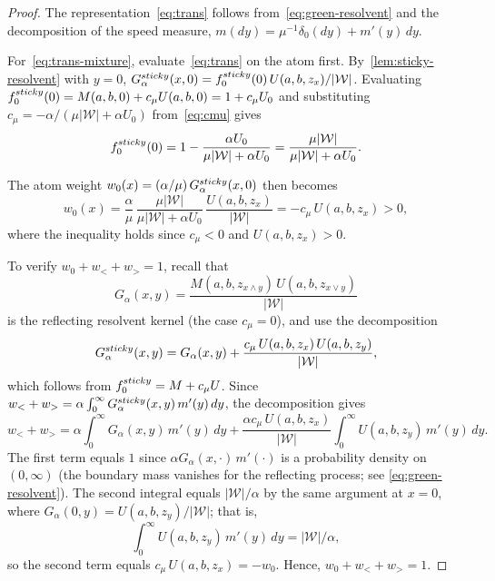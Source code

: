 \documentclass[10pt,a4paper]{amsart}
\begin{document}
\begin{proof}
  The representation~\cref{eq:trans} follows from~\cref{eq:green-resolvent}
  and the decomposition of the speed measure,
  $m(dy)=\mu^{-1}\delta_0(dy)+m'(y)\,dy$.

  For~\cref{eq:trans-mixture}, evaluate~\cref{eq:trans} on the atom first.
  By~\cref{lem:sticky-resolvent} with $y=0$,
  $G^{\rm sticky}_\alpha(x,0) = f_0^{\rm sticky}(0)\,U(a,b,z_x)/|\mathcal{W}|$.
  Evaluating $f_0^{\rm sticky}(0) = M(a,b,0)+c_\mu U(a,b,0) = 1+c_\mu U_0$
  and substituting $c_\mu=-\alpha/(\mu|\mathcal{W}|+\alpha U_0)$
  from~\cref{eq:cmu} gives
  \begin{equation}\label{eq:f0sticky-zero}   
    f_0^{\rm sticky}(0)
    = 1 - \frac{\alpha U_0}{\mu|\mathcal{W}|+\alpha U_0}
    = \frac{\mu|\mathcal{W}|}{\mu|\mathcal{W}|+\alpha U_0}.
  \end{equation}

  The atom weight $w_0(x) = (\alpha/\mu)\,G^{\rm sticky}_\alpha(x,0)$ then
  becomes
  \[
    w_0(x)
    = \frac{\alpha}{\mu}
      \,\frac{\mu|\mathcal{W}|}{\mu|\mathcal{W}|+\alpha U_0}
      \,\frac{U(a,b,z_x)}{|\mathcal{W}|}
    = -c_\mu\,U(a,b,z_x) > 0,
  \]
  where the inequality holds since $c_\mu<0$ and $U(a,b,z_x)>0$.

  To verify $w_0+w_<+w_>=1$, recall that
  \[
    G_\alpha(x,y) = \frac{M(a,b,z_{x\wedge y})\,U(a,b,z_{x\vee y})}{|\mathcal{W}|}
  \]
  is the reflecting resolvent kernel (the case $c_\mu=0$), and use the decomposition
  \[
    G^{\rm sticky}_\alpha(x,y)
    = G_\alpha(x,y)
    + \frac{c_\mu\,U(a,b,z_x)\,U(a,b,z_y)}{|\mathcal{W}|},
  \]
  which follows from $f^{\rm sticky}_0 = M + c_\mu U$. Since
  $w_<+w_> = \alpha\int_0^\infty G^{\rm sticky}_\alpha(x,y)\,m'(y)\,dy$,
  the decomposition gives
  \[
    w_<+w_>
    = \alpha\int_0^\infty G_\alpha(x,y)\,m'(y)\,dy
    + \frac{\alpha c_\mu\,U(a,b,z_x)}{|\mathcal{W}|}\int_0^\infty U(a,b,z_y)\,m'(y)\,dy.
  \]
  The first term equals $1$ since $\alpha G_\alpha(x,\cdot)\,m'(\cdot)$
  is a probability density on $(0,\infty)$ (the boundary mass vanishes for
  the reflecting process; see \cref{eq:green-resolvent}).
  The second integral equals $|\mathcal{W}|/\alpha$ by the same argument at
  $x=0$, where $G_\alpha(0,y)=U(a,b,z_y)/|\mathcal{W}|$; that is,
  \begin{equation}\label{eq:U-integral}
    \int_0^\infty U(a,b,z_y)\,m'(y)\,dy = |\mathcal{W}|/\alpha,
  \end{equation}
  so the second term equals $c_\mu\,U(a,b,z_x)=-w_0$.
  Hence, $w_0+w_<+w_>=1$.
\end{proof} 
\end{document}

